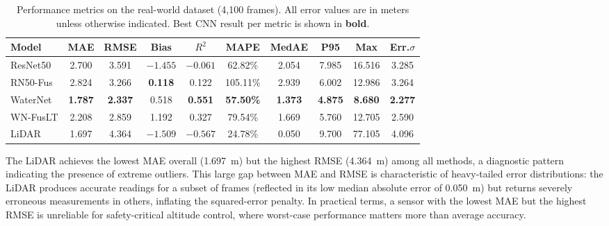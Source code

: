 \begin{table}[htbp]
    \caption{Performance metrics on the real-world dataset (4{,}100 frames). All error values are in meters unless otherwise indicated. Best CNN result per metric is shown in \textbf{bold}.}
    \begin{center}
        \small
        \begin{tabular}{|l|c|c|c|c|c|c|c|c|c|}
        \hline
        \textbf{Model}
            & \textbf{MAE}
            & \textbf{RMSE}
            & \textbf{Bias}
            & \textbf{$R^2$}
            & \textbf{MAPE}
            & \textbf{MedAE}
            & \textbf{P95}
            & \textbf{Max}
            & \textbf{Err.$\sigma$} \\
        \hline
        ResNet50
            & 2.700
            & 3.591
            & $-1.455$
            & $-0.061$
            & 62.82\%
            & 2.054
            & 7.985
            & 16.516
            & 3.285 \\
        \hline
        RN50-Fus
            & 2.824
            & 3.266
            & \textbf{0.118}
            & 0.122
            & 105.11\%
            & 2.939
            & 6.002
            & 12.986
            & 3.264 \\
        \hline
        WaterNet
            & \textbf{1.787}
            & \textbf{2.337}
            & 0.518
            & \textbf{0.551}
            & \textbf{57.50\%}
            & \textbf{1.373}
            & \textbf{4.875}
            & \textbf{8.680}
            & \textbf{2.277} \\
        \hline
        WN-FusLT
            & 2.208
            & 2.859
            & 1.192
            & 0.327
            & 79.54\%
            & 1.669
            & 5.760
            & 12.705
            & 2.590 \\
        \hline
        LiDAR
            & 1.697
            & 4.364
            & $-1.509$
            & $-0.567$
            & 24.78\%
            & 0.050
            & 9.700
            & 77.105
            & 4.096 \\
        \hline
        \end{tabular}
    \label{tab:real_metrics}
    \end{center}
\end{table}

The LiDAR achieves the lowest MAE overall (1.697~m) but the highest RMSE (4.364~m) among all methods, a diagnostic pattern indicating the presence of extreme outliers. This large gap between MAE and RMSE is characteristic of heavy-tailed error distributions: the LiDAR produces accurate readings for a subset of frames (reflected in its low median absolute error of 0.050~m) but returns severely erroneous measurements in others, inflating the squared-error penalty. In practical terms, a sensor with the lowest MAE but the highest RMSE is unreliable for safety-critical altitude control, where worst-case performance matters more than average accuracy.

